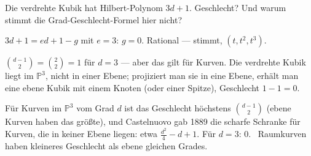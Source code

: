 \begin{aufgabe}
Die verdrehte Kubik hat Hilbert-Polynom $3d + 1$. Geschlecht? Und warum stimmt die Grad-Geschlecht-Formel hier nicht?

\loesung
{}
$3d + 1 = ed + 1 - g$ mit $e = 3$: $g = 0$. Rational --- stimmt, $(t, t^{2}, t^{3})$.

$\binom{d-1}{2} = \binom22 = 1$ für $d = 3$ --- aber das gilt für  Kurven. Die verdrehte Kubik liegt im $\mathbb P^{3}$, nicht in einer Ebene; projiziert man sie in eine Ebene, erhält man eine ebene Kubik mit einem Knoten (oder einer Spitze), Geschlecht $1 - 1 = 0$. \checkmark

Für Kurven im $\mathbb P^{3}$ vom Grad $d$ ist das Geschlecht höchstens $\binom{d-1}{2}$ (ebene Kurven haben das größte), und Castelnuovo gab 1889 die scharfe Schranke für Kurven, die in keiner Ebene liegen: etwa $\frac{d^{2}}{4} - d + 1$. Für $d = 3$: $0$. \checkmark\ Raumkurven haben kleineres Geschlecht als ebene gleichen Grades.

\begin{center}
\begin{minipage}{0.88\textwidth}
\end{minipage}
\end{center}
\end{aufgabe}

